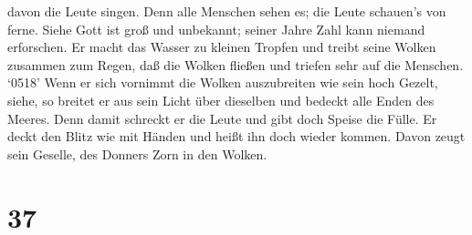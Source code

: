 davon die Leute singen.  Denn alle Menschen sehen es; die
Leute schauen's von ferne.  Siehe Gott ist groß und
unbekannt; seiner Jahre Zahl kann niemand erforschen.  Er
macht das Wasser zu kleinen Tropfen und treibt seine Wolken zusammen zum
Regen,  daß die Wolken fließen und triefen sehr auf die
Menschen.  `0518' Wenn er sich vornimmt die Wolken
auszubreiten wie sein hoch Gezelt,  siehe, so breitet er
aus sein Licht über dieselben und bedeckt alle Enden des Meeres.
 Denn damit schreckt er die Leute und gibt doch Speise die
Fülle.  Er deckt den Blitz wie mit Händen und heißt ihn
doch wieder kommen.  Davon zeugt sein Geselle, des Donners
Zorn in den Wolken.

\hypertarget{section-36}{%
\section{37}\label{section-36}}

